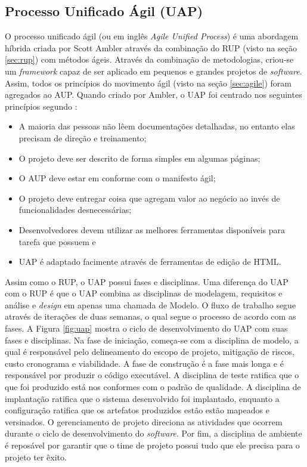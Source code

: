 \subsection{Processo Unificado Ágil (UAP)}

O processo unificado ágil (ou em inglês \textit{Agile Unified Process}) é uma abordagem híbrida criada por Scott Ambler através da combinação do RUP (visto na seção \ref{sec:rup}) com métodos ágeis. Através da combinação de metodologias, criou-se um \textit{framework} capaz de ser aplicado em pequenos e grandes projetos de \textit{software}. Assim, todos os princípios do movimento ágil (visto na seção \ref{sec:agile}) foram agregados ao AUP.
Quando criado por Ambler, o UAP foi centrado nos seguintes princípios segundo :

\begin{itemize}
	\item A maioria das pessoas não lêem documentações detalhadas, no entanto elas precisam de direção e treinamento;
	\item O projeto deve ser descrito de forma simples em algumas páginas;
	\item O AUP deve estar em conforme com o manifesto ágil;
	\item O projeto deve entregar coisa que agregam valor ao negócio ao invés de funcionalidades desnecessárias;
	\item Desenvolvedores devem utilizar as melhores ferramentas disponíveis para tarefa que possuem e
	\item UAP é adaptado facimente através de ferramentas de edição de HTML.
\end{itemize}

Assim como o RUP, o UAP possui fases e disciplinas. Uma diferença do UAP com o RUP é que o UAP combina as disciplinas de modelagem, requisitos e análise e \textit{design} em apenas uma chamada de Modelo. O fluxo de trabalho segue através de iterações de duas semanas, o qual segue o processo de acordo com as fases. A Figura \ref{fig:uap} mostra o ciclo de desenvolvimento do UAP com suas fases e disciplinas. Na fase de iniciação, começa-se com a disciplina de modelo, a qual é responsável pelo delineamento do escopo de projeto, mitigação de riscos, custo cronograma e viabilidade. A fase de construção é a fase mais longa e é responsável por produzir o código executável. A disciplina de teste ratifica que o que foi produzido está nos conformes com o padrão de qualidade. A disciplina de implantação ratifica que o sistema desenvolvido foi implantado, enquanto a configuração ratifica que os artefatos produzidos estão estão mapeados e versinados. O gerenciamento de projeto direciona as atividades que ocorrem durante o ciclo de desenvolvimento do \textit{software}. Por fim, a disciplina de ambiente é reposável por garantir que o time de projeto possui tudo que ele precisa para o projeto ter êxito. \cite{edeki:13}

